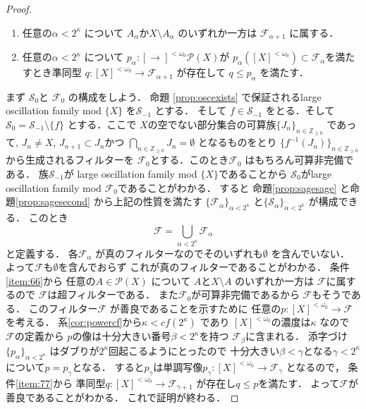 \documentclass[leqno, a4paper, 12pt]{jsarticle}
\newcommand{\zz}{\mathbb{Z}}
\newcommand{\myfinset}[1]{[#1]^{<\omega_{0}}}
\newcommand{\myfil}[1]{\mathcal{#1}}
\newcommand{\myfam}[1]{\mathscr{#1}}
\newcommand{\mycf}[1]{cf(#1)}
\newcommand{\mypowset}[1]{\mathcal{P}(#1)}
\begin{document}
\begin{proof}
\begin{enumerate}[label=\textup{(K\arabic*)}]
\item\label{item:66}
任意の$\alpha<2^{\kappa}$
について
$A_{\alpha}$か$X\setminus A_{\alpha}$
のいずれか一方は
$\myfil{F}_{\alpha+1}$
に属する．


\item\label{item:77}
任意の$\alpha <2^{\kappa}$
について
$p_{\alpha}\colon \myfinset \to \mypowset{X}$が
$p_{\alpha}(\myfinset{X})\subset \myfil{F}_{\alpha}$を満たすとき準同型
$q\colon \myfinset{X}\to \myfil{F}_{\alpha+1}$
が存在して
$q\le p_{\alpha}$
を満たす．

\end{enumerate}
まず
$\myfam{S}_{0}$と
$\myfil{F}_{0}$
の構成をしよう．
命題
\ref{prop:oscexists}
で保証されるlarge oscillation family mod $\{X\}$
を$\myfam{S}_{-1}$
とする．
そして
$f\in \myfam{S}_{-1}$
をとる．そして
$\myfam{S}_{0}=\myfam{S}_{-1}\setminus \{f\}$
とする．ここで
$X$の空でない部分集合の可算族$\{J_{n}\}_{n\in \zz_{\ge 0}}$
であって, 
$J_{n}\neq X$, 
$J_{n+1}\subset J_{n}$かつ
$\bigcap_{n\in \zz_{\ge 0}}J_{n}=\emptyset$
となるものをとり
$\{f^{-1}(J_{n})\}_{n\in \zz_{\ge 0}}$から生成されるフィルターを
$\myfil{F}_{0}$とする．このとき$\myfil{F}_{0}$
はもちろん可算非完備である．
族$\myfam{S}_{-1}$が
large oscillation family mod $\{X\}$であることから
$\myfam{S}_{0}$がlarge oscillation family mod 
$\myfil{F}_{0}$であることがわかる．
すると
命題\ref{prop:sagesage}
と命題\ref{prop:sagesecond}
から上記の性質を満たす
$\{\myfil{F}_{\alpha}\}_{\alpha<2^{\kappa}}$
と$\{\myfam{S}_{\alpha}\}_{\alpha<2^{\kappa}}$
が構成できる．
このとき
\[
\myfil{F}=\bigcup_{\alpha<2^{\kappa}}\myfil{F}_{\alpha}
\]
と定義する．
各$\myfil{F}_{\alpha}$
が真のフィルターなのでそのいずれも$\emptyset$
を含んでいない．
よって$\myfil{F}$も$\emptyset$を含んでおらず
これが真のフィルターであることがわかる．
条件\ref{item:66}から
任意の$A\in \mypowset{X}$
について
$A$と$X\setminus A$
のいずれか一方は
$\myfil{F}$に属するので
$\myfil{F}$は超フィルターである．
また$\myfil{F}_{0}$が可算非完備であるから
$\myfil{F}$もそうである．
このフィルター$\myfil{F}$
が善良であることを示すために
任意の$p\colon \myfinset{X}\to \myfil{F}$
を考える．
系\ref{cor:powercf}から$\kappa<\mycf{2^{\kappa}}$
であり
$\myfinset{X}$の濃度は$\kappa$
なので
$\myfil{F}$の定義から
$p$の像は十分大きい番号$\beta<2^{\kappa}$を持つ
$\myfil{F}_{\beta}$に含まれる．
添字づけ$\{p_{\alpha}\}_{\alpha<2^{\kappa}}$
はダブりが$2^{\kappa}$回起こるようにとったので
十分大きい$\beta<\gamma$となる$\gamma<2^{\kappa}$
について$p=p_{\gamma}$となる．
すると$p_{\gamma}$は単調写像$p_{\gamma}\colon \myfinset{X}\to \myfil{F}_{\gamma}$
となるので，
条件\ref{item:77}から
準同型$q\colon \myfinset{X}\to \myfil{F}_{\gamma+1}$
が存在し$q\le p$を満たす．
よって$\myfil{F}$が善良であることがわかる．
これで証明が終わる．
\end{proof}
\end{document}
